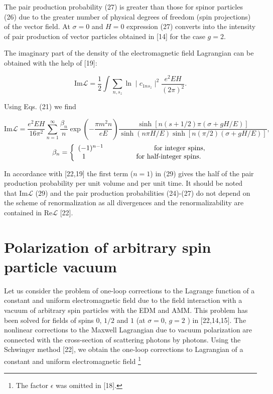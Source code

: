 \documentclass[a4paper,12pt]{article}
\begin{document}
The pair production probability (27) is greater than those for spinor
particles (26) due to the greater number of physical degrees of freedom
(spin projections) of the vector field. At $\sigma=0$ and $H=0$ expression
(27) converts into the intensity of pair production of vector particles
obtained in [14] for the case $g=2$.

The imaginary part of the density of the electromagnetic field Lagrangian
can be obtained with the help of [19]:

\begin{equation}
\mbox{Im}\mathcal{L}=\frac 12\int \sum_{n,s_z}\ln \mid
c_{1ns_z}\mid ^2\frac{ e^2EH}{(2\pi )^2}.  \label{28}
\end{equation}

Using Eqs. (21) we find

\[
\mbox{Im}\mathcal{L}=\frac{e^2EH}{16\pi ^2}\sum_{n=1}^\infty
\frac{\beta _n} n\exp \left( -\frac{\pi m^2n}{eE}\right)
\frac{\sinh \left[ n(s+1/2)\pi \left( \sigma +gH/E\right) \right]
}{\sinh \left( n\pi H/E\right) \sinh \left[ n\left( \pi /2\right)
\left( \sigma +gH/E\right) \right] },
\]
\vspace{-8mm}
\begin{equation}  \label{29}
\end{equation}
\vspace{-8mm}
\[
\beta _n=\biggl \{
\begin{array}{c}
(-1)^{n-1}\hspace{1.0in}\mbox{{for~integer spins}}, \\
1\hspace{1.0in}\mbox{{for~half-integer spins}}.
\end{array}
\]

In accordance with [22,19] the first term ($n=1$) in (29) gives the half of
the pair production probability per unit volume and per unit time. It should
be noted that Im$\mathcal{L}$ (29) and the pair production probabilities
(24)-(27) do not depend on the scheme of renormalization as all divergences
and the renormalizability are contained in Re$\mathcal{L}$ [22].

\section{Polarization of arbitrary spin particle vacuum}

Let us consider the problem of one-loop corrections to the Lagrange function
of a constant and uniform electromagnetic field due to the field interaction
with a vacuum of arbitrary spin particles with the EDM and AMM. This problem
has been solved for fields of spins $0$, $1/2$ and $1$ (at $\sigma =0$, $g=2$
) in [22,14,15]. The nonlinear corrections to the Maxwell Lagrangian due to
vacuum polarization are connected with the cross-section of scattering
photons by photons. Using the Schwinger method [22], we obtain the one-loop
corrections to Lagrangian of a constant and uniform electromagnetic field
\footnote{The factor $\epsilon $ was omitted in [18].}
\end{document}
